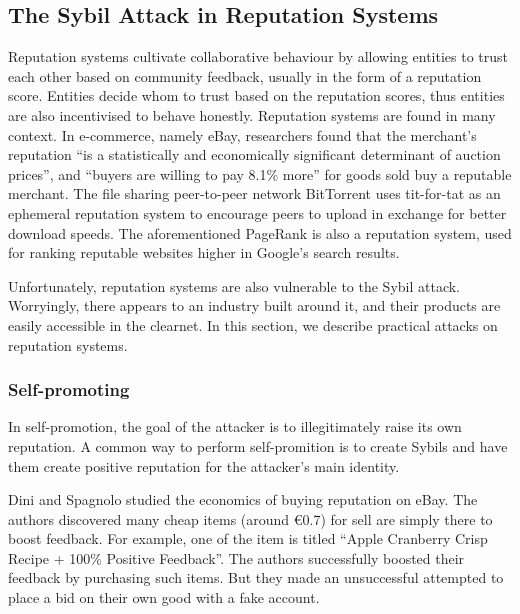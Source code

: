 \subsection{The Sybil Attack in Reputation Systems}\label{sec:reputation-attack}
Reputation systems cultivate collaborative behaviour by allowing entities to
trust each other based on community feedback, usually in the form of a
reputation score. Entities decide whom to trust based on the reputation scores,
thus entities are also incentivised to behave honestly. Reputation systems are
found in many context. In e-commerce, namely eBay, researchers found that the
merchant's reputation ``is a statistically and economically significant
determinant of auction prices''\cite{houser2006reputation}, and ``buyers are
willing to pay 8.1\% more'' for goods sold buy a reputable
merchant\cite{resnick2006value}. The file sharing peer-to-peer network
BitTorrent uses tit-for-tat as an ephemeral reputation system to encourage peers
to upload in exchange for better download speeds\cite{cohen2003incentives}. The
aforementioned PageRank\cite{page1999pagerank} is also a reputation system, used
for ranking reputable websites higher in Google's search results.

Unfortunately, reputation systems are also vulnerable to the Sybil attack.
Worryingly, there appears to an industry built around it, and their products are
easily accessible in the clearnet. In this section, we describe practical
attacks on reputation systems.

\subsubsection{Self-promoting}
In self-promotion, the goal of the attacker is to illegitimately raise its own
reputation. A common way to perform self-promition is to create Sybils and have
them create positive reputation for the attacker's main identity.

Dini and Spagnolo studied the economics of buying reputation on eBay. The
authors discovered many cheap items (around \euro{0.7}) for sell are simply there to
boost feedback. For example, one of the item is titled ``Apple Cranberry Crisp
Recipe + 100\% Positive Feedback''. The authors successfully boosted their
feedback by purchasing such items. But they made an unsuccessful attempted to
place a bid on their own good with a fake account\cite{dini2009buying}.


